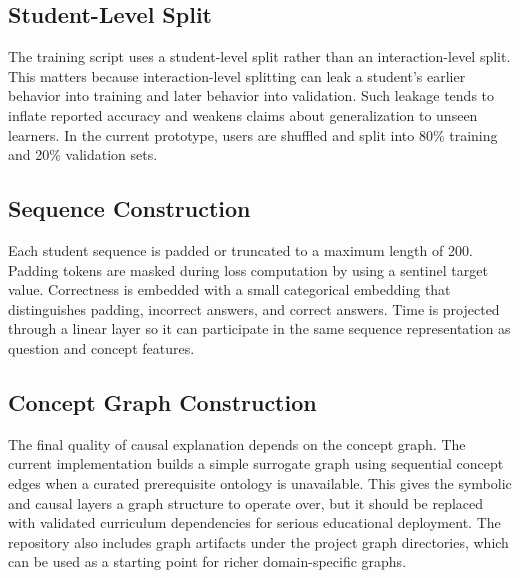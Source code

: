 \documentclass[conference]{IEEEtran}
\begin{document}
\subsection{Student-Level Split}
The training script uses a student-level split rather than an interaction-level split. This matters because interaction-level splitting can leak a student's earlier behavior into training and later behavior into validation. Such leakage tends to inflate reported accuracy and weakens claims about generalization to unseen learners. In the current prototype, users are shuffled and split into 80\% training and 20\% validation sets.

\subsection{Sequence Construction}
Each student sequence is padded or truncated to a maximum length of 200. Padding tokens are masked during loss computation by using a sentinel target value. Correctness is embedded with a small categorical embedding that distinguishes padding, incorrect answers, and correct answers. Time is projected through a linear layer so it can participate in the same sequence representation as question and concept features.

\subsection{Concept Graph Construction}
The final quality of causal explanation depends on the concept graph. The current implementation builds a simple surrogate graph using sequential concept edges when a curated prerequisite ontology is unavailable. This gives the symbolic and causal layers a graph structure to operate over, but it should be replaced with validated curriculum dependencies for serious educational deployment. The repository also includes graph artifacts under the project graph directories, which can be used as a starting point for richer domain-specific graphs.
\end{document}
